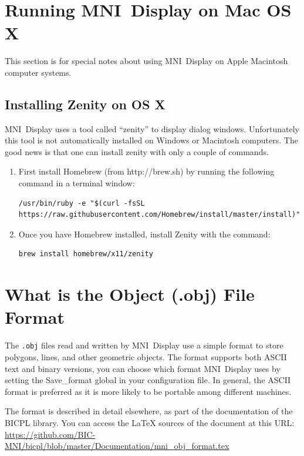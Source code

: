 \documentclass[11pt,letterpaper]{article}
\newcommand{\ident}[1]{{\tt #1}}
\newcommand{\display}{\mbox{MNI Display}}
\begin{document}
\appendix

\section{Running \display{} on Mac OS X}

This section is for special notes about using \display{} on Apple
Macintosh computer systems.

\subsection{Installing Zenity on OS X}

\display{} uses a tool called ``zenity'' to display dialog windows. Unfortunately this tool is not automatically installed on Windows or Macintosh computers. The good news is that one can install zenity with only a couple of commands.

\begin{enumerate}
\item First install Homebrew (from http://brew.sh) by running the following command in a terminal window:
\begin{verbatim}
/usr/bin/ruby -e "$(curl -fsSL https://raw.githubusercontent.com/Homebrew/install/master/install)"
\end{verbatim}

\item Once you have Homebrew installed, install Zenity with the command:
\begin{verbatim}
brew install homebrew/x11/zenity
\end{verbatim}
\end{enumerate}










\section{What is the Object (.obj) File Format}

The \ident{.obj} files read and written by \display{} use a simple
format to store polygons, lines, and other geometric objects. The
format supports both ASCII text and binary versions, you can choose
which format \display{} uses by setting the Save\_format global in
your configuration file. In general, the ASCII format is preferred as
it is more likely to be portable among different machines.

The format is described in detail elsewhere, as part of the
documentation of the BICPL library. You can access the \LaTeX{}
sources of the document at this URL:
\url{https://github.com/BIC-MNI/bicpl/blob/master/Documentation/mni_obj_format.tex}
\end{document}
